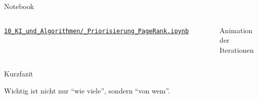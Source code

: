 \begin{frame}{Notebook}
    \begin{columns}
        \begin{myremark}
            \footnotesize\href{https://cyrilblum.github.io/FreeFlower/jupyter/}{\texttt{10\_KI\_und\_Algorithmen/\_Priorisierung\_\allowbreak PageRank.ipynb}}
        \end{myremark}
        \begin{figure}[H]
            \centering
            \caption*{Animation der Iterationen}
        \end{figure}
    \end{columns}
\end{frame}

\begin{frame}{Kurzfazit}
    \begin{center}
        \Large Wichtig ist nicht nur \enquote{wie viele}, sondern \enquote{von wem}.
    \end{center}
\end{frame}
